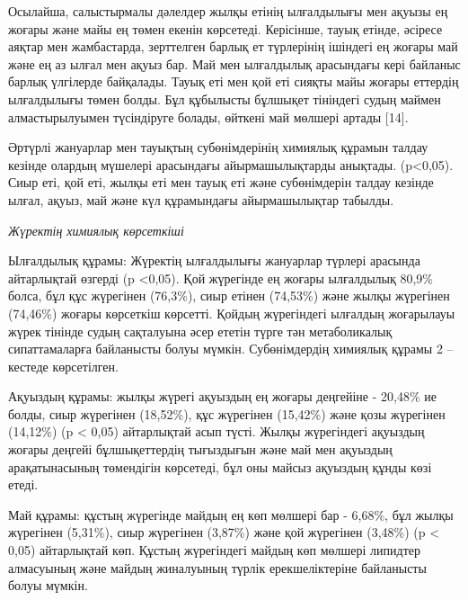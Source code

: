\begin{multicols}{2}
Осылайша, салыстырмалы дәлелдер жылқы етінің ылғалдылығы мен ақуызы ең
жоғары және майы ең төмен екенін көрсетеді. Керісінше, тауық етінде,
әсіресе аяқтар мен жамбастарда, зерттелген барлық ет түрлерінің ішіндегі
ең жоғары май және ең аз ылғал мен ақуыз бар. Май мен ылғалдылық
арасындағы кері байланыс барлық үлгілерде байқалады. Тауық еті мен қой
еті сияқты майы жоғары еттердің ылғалдылығы төмен болды. Бұл құбылысты
бұлшықет тініндегі судың маймен алмастырылуымен түсіндіруге болады,
өйткені май мөлшері артады {[}14{]}.

Әртүрлі жануарлар мен тауықтың субөнімдерінің химиялық құрамын талдау
кезінде олардың мүшелері арасындағы айырмашылықтарды анықтады.
(p\textless0,05). Сиыр еті, қой еті, жылқы еті мен тауық еті және
субөнімдерін талдау кезінде ылғал, ақуыз, май және күл құрамындағы
айырмашылықтар табылды.

\emph{Жүректің химиялық көрсеткіші}

Ылғалдылық құрамы: Жүректің ылғалдылығы жануарлар түрлері арасында
айтарлықтай өзгерді (p \textless0,05). Қой жүрегінде ең жоғары
ылғалдылық 80,9\% болса, бұл құс жүрегінен (76,3\%), сиыр етінен
(74,53\%) және жылқы жүрегінен (74,46\%) жоғары көрсеткіш көрсетті.
Қойдың жүрегіндегі ылғалдың жоғарылауы жүрек тінінде судың сақталуына
әсер ететін түрге тән метаболикалық сипаттамаларға байланысты болуы
мүмкін. Субөнімдердің химиялық құрамы 2 -- кестеде көрсетілген.

Ақуыздың құрамы: жылқы жүрегі ақуыздың ең жоғары деңгейіне - 20,48\% ие
болды, сиыр жүрегінен (18,52\%), құс жүрегінен (15,42\%) және қозы
жүрегінен (14,12\%) (p \textless{} 0,05) айтарлықтай асып түсті. Жылқы
жүрегіндегі ақуыздың жоғары деңгейі бұлшықеттердің тығыздығын және май
мен ақуыздың арақатынасының төмендігін көрсетеді, бұл оны майсыз
ақуыздың құнды көзі етеді.

Май құрамы: құстың жүрегінде майдың ең көп мөлшері бар - 6,68\%, бұл
жылқы жүрегінен (5,31\%), сиыр жүрегінен (3,87\%) және қой жүрегінен
(3,48\%) (p \textless{} 0,05) айтарлықтай көп. Құстың жүрегіндегі майдың
көп мөлшері липидтер алмасуының және майдың жиналуының түрлік
ерекшеліктеріне байланысты болуы мүмкін.
\end{multicols}

